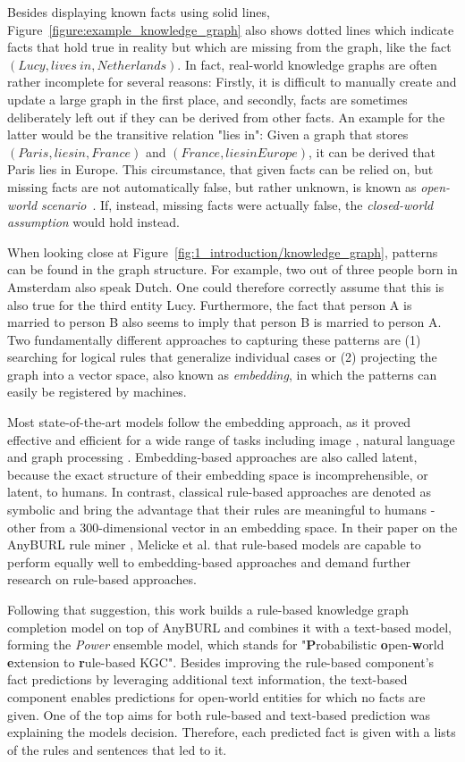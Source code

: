Besides displaying known facts using solid lines, Figure~\ref{figure:example_knowledge_graph} also shows dotted lines which indicate facts that hold true in reality but which are missing from the graph, like the fact $(Lucy, lives~in, Netherlands)$. In fact, real-world knowledge graphs are often rather incomplete for several reasons: Firstly, it is difficult to manually create and update a large graph in the first place, and secondly, facts are sometimes deliberately left out if they can be derived from other facts. An example for the latter would be the transitive relation "lies in": Given a graph that stores $(Paris, lies in, France)$ and $(France, lies in Europe)$, it can be derived that Paris lies in Europe. This circumstance, that given facts can be relied on, but missing facts are not automatically false, but rather unknown, is known as \emph{open-world scenario}~\cite{}. If, instead, missing facts were actually false, the \emph{closed-world assumption} would hold instead.

When looking close at Figure~\ref{fig:1_introduction/knowledge_graph}, patterns can be found in the graph structure. For example, two out of three people born in Amsterdam also speak Dutch. One could therefore correctly assume that this is also true for the third entity Lucy. Furthermore, the fact that person A is married to person B also seems to imply that person B is married to person A. Two fundamentally different approaches to capturing these patterns are (1) searching for logical rules that generalize individual cases or (2) projecting the graph into a vector space, also known as \emph{embedding}, in which the patterns can easily be registered by machines.

Most state-of-the-art models follow the embedding approach, as it proved effective and efficient for a wide range of tasks including image \cite{}, natural language \cite{} and graph processing \cite{}. Embedding-based approaches are also called latent, because the exact structure of their embedding space is incomprehensible, or latent, to humans. In contrast, classical rule-based approaches are denoted as symbolic and bring the advantage that their rules are meaningful to humans - other from a 300-dimensional vector in an embedding space. In their paper on the AnyBURL rule miner \cite{}, Melicke et al. that rule-based models are capable to perform equally well to embedding-based approaches and demand further research on rule-based approaches.

Following that suggestion, this work builds a rule-based knowledge graph completion model on top of AnyBURL and combines it with a text-based model, forming the \emph{Power} ensemble model, which stands for "\textbf{P}robabilistic \textbf{o}pen-\textbf{w}orld \textbf{e}xtension to \textbf{r}ule-based KGC". Besides improving the rule-based component's fact predictions by leveraging additional text information, the text-based component enables predictions for open-world entities for which no facts are given. One of the top aims for both rule-based and text-based prediction was explaining the models decision. Therefore, each predicted fact is given with a lists of the rules and sentences that led to it.

